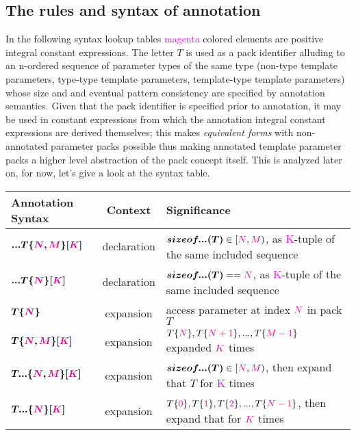 
\subsection{The rules and syntax of annotation}

\p In the following syntax lookup tables \textcolor{Magenta}{magenta} colored elements are positive integral constant expressions.
The letter $T$ is used as a pack identifier alluding to an n-ordered sequence of parameter types of the same type (non-type template parameters, type-type template parameters, template-type template parameters) whose size and and eventual pattern consistency are specified by annotation semantics.
Given that the pack identifier is specified prior to annotation, it may be used in constant expressions from which the annotation integral constant expressions are derived themselves; this makes \textit{equivalent forms} with non-annotated parameter packs possible thus making annotated template parameter packs a higher level abstraction of the pack concept itself.
This is analyzed later on, for now, let's give a look at the syntax table.

\begin{tabularx}{\textwidth}{l|c|X}
  \textbf{Annotation Syntax} & \textbf{Context}  &\textbf{Significance} \\
\hline
$\bm{...T\{\textcolor{Magenta}{\textcolor{Magenta}{N}},\textcolor{Magenta}{M}\}[\textcolor{Magenta}{K}]}$ & declaration & $\bm{sizeof...(T)} \in [\textcolor{Magenta}{N},\textcolor{Magenta}{M})$, as \textcolor{Magenta}{K}-tuple of the same included sequence \\
$\bm{...T\{\textcolor{Magenta}{N}\}[\textcolor{Magenta}{K}]}$ & declaration & $\bm{sizeof...(T)} == \textcolor{Magenta}{N}$, as \textcolor{Magenta}{K}-tuple of the same included sequence \\
$\bm{T\{\textcolor{Magenta}{N}\}}$ & expansion & access parameter at index $\textcolor{Magenta}{N}$ in pack $T$ \\
$\bm{T\{\textcolor{Magenta}{N},\textcolor{Magenta}{M}\}[\textcolor{Magenta}{K}]}$ & expansion & $T\{\textcolor{Magenta}{N}\},T\{\textcolor{Magenta}{N+1}\},...,T\{\textcolor{Magenta}{M-1}\}$ expanded $\textcolor{Magenta}{K}$ times \\
$\bm{T...\{\textcolor{Magenta}{N},\textcolor{Magenta}{M}\}[\textcolor{Magenta}{K}]}$ & expansion & $\bm{sizeof...(T)} \in [\textcolor{Magenta}{N},\textcolor{Magenta}{M})$, then expand that $T$ for \textcolor{Magenta}{K} times   \\
$\bm{T...\{\textcolor{Magenta}{N}\}[\textcolor{Magenta}{K}]}$ & expansion & $T\{\textcolor{Magenta}{0}\},T\{\textcolor{Magenta}{1}\},T\{\textcolor{Magenta}{2}\},...,T\{\textcolor{Magenta}{N-1}\}$, then expand that for $\textcolor{Magenta}{K}$ times\\
\end{tabularx}

